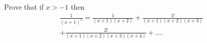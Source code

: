 Prove that if $x > -1$ then
\begin{multline*}
\frac{1}{(x + 1)^{2}}
  = \frac{1}{(x + 1) (x + 2)}
  + \frac{1!}{(x + 1) (x + 2) (x + 3)}\\
  + \frac{2!}{(x + 1) (x + 2) (x + 3) (x + 4)} + \dots.
\end{multline*}

